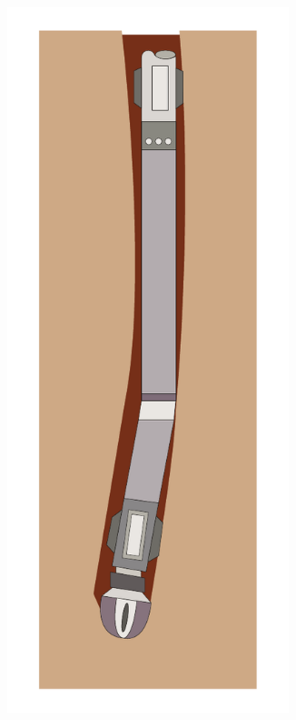 \begin{figure}[ht]\centering
	\begin{subfigure}[b]{0.15\textwidth}
		\includegraphics[width=0.9\textwidth]{img/drillingmode1.pdf}

\end{subfigure}
\end{figure}
